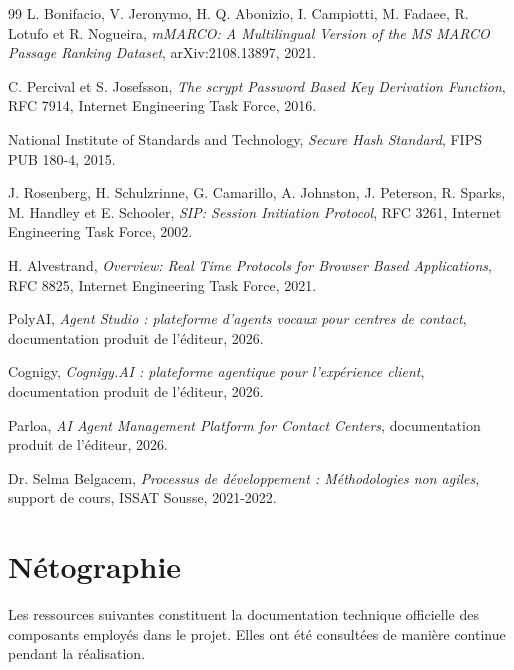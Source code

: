 \begin{thebibliography}{99}
L. Bonifacio, V. Jeronymo, H. Q. Abonizio, I. Campiotti, M. Fadaee, R. Lotufo et R. Nogueira,
\textit{mMARCO: A Multilingual Version of the MS MARCO Passage Ranking Dataset},
arXiv:2108.13897, 2021.

C. Percival et S. Josefsson,
\textit{The scrypt Password Based Key Derivation Function},
RFC 7914, Internet Engineering Task Force, 2016.

National Institute of Standards and Technology,
\textit{Secure Hash Standard},
FIPS PUB 180-4, 2015.

J. Rosenberg, H. Schulzrinne, G. Camarillo, A. Johnston, J. Peterson, R. Sparks, M. Handley
et E. Schooler,
\textit{SIP: Session Initiation Protocol},
RFC 3261, Internet Engineering Task Force, 2002.

H. Alvestrand,
\textit{Overview: Real Time Protocols for Browser Based Applications},
RFC 8825, Internet Engineering Task Force, 2021.

PolyAI, \textit{Agent Studio : plateforme d'agents vocaux pour centres de contact},
documentation produit de l'éditeur, 2026.

Cognigy, \textit{Cognigy.AI : plateforme agentique pour l'expérience client},
documentation produit de l'éditeur, 2026.

Parloa, \textit{AI Agent Management Platform for Contact Centers},
documentation produit de l'éditeur, 2026.

Dr. Selma Belgacem, \textit{Processus de d\'eveloppement : M\'ethodologies non agiles},
support de cours, ISSAT Sousse, 2021-2022.

\end{thebibliography}

\newpage

\chapter*{Nétographie}

Les ressources suivantes constituent la documentation technique officielle des composants
employés dans le projet. Elles ont été consultées de manière continue pendant la réalisation.

